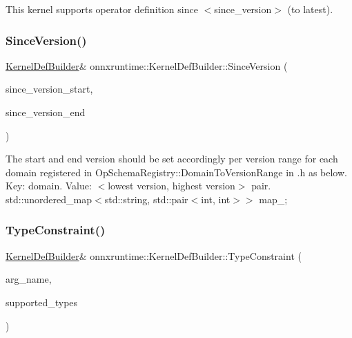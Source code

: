 This kernel supports operator definition since $<$since\+\_\+version$>$ (to latest). \mbox{\label{classonnxruntime_1_1KernelDefBuilder_a62f33b8471d08dd6d3c8acf086dc33a4}} 
\subsubsection{\texorpdfstring{Since\+Version()}{SinceVersion()}\hspace{0.1cm}{\footnotesize\ttfamily [2/2]}}
{\footnotesize\ttfamily \mbox{\hyperlink{classonnxruntime_1_1KernelDefBuilder}{Kernel\+Def\+Builder}}\& onnxruntime\+::\+Kernel\+Def\+Builder\+::\+Since\+Version (\begin{DoxyParamCaption}\item[{int}]{since\+\_\+version\+\_\+start,  }\item[{int}]{since\+\_\+version\+\_\+end }\end{DoxyParamCaption})\hspace{0.3cm}{\ttfamily [inline]}}

The start and end version should be set accordingly per version range for each domain registered in Op\+Schema\+Registry\+::\+Domain\+To\+Version\+Range in .h as below. Key\+: domain. Value\+: $<$lowest version, highest version$>$ pair. std\+::unordered\+\_\+map$<$std\+::string, std\+::pair$<$int, int$>$$>$ map\+\_\+; \mbox{\label{classonnxruntime_1_1KernelDefBuilder_aa0b8ea800fdf94fdb0bfac4695b75e9a}} 
\subsubsection{\texorpdfstring{Type\+Constraint()}{TypeConstraint()}\hspace{0.1cm}{\footnotesize\ttfamily [1/2]}}
{\footnotesize\ttfamily \mbox{\hyperlink{classonnxruntime_1_1KernelDefBuilder}{Kernel\+Def\+Builder}}\& onnxruntime\+::\+Kernel\+Def\+Builder\+::\+Type\+Constraint (\begin{DoxyParamCaption}\item[{const std\+::string \&}]{arg\+\_\+name,  }\item[{const std\+::vector$<$ \mbox{\hyperlink{namespaceonnxruntime_ad77d0a6e838ec7da5dc35fed5ee66b49}{M\+L\+Data\+Type}} $>$ \&}]{supported\+\_\+types }\end{DoxyParamCaption})\hspace{0.3cm}{\ttfamily [inline]}}

